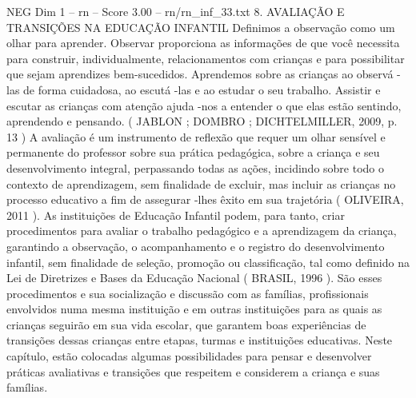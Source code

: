 \begin{textsample}{NEG Dim 1 – rn – Score 3.00 – rn/rn\_inf\_33.txt}  \label{ex:f1_neg_028}
8.
AVALIAÇÃO E TRANSIÇÕES NA EDUCAÇÃO INFANTIL Definimos a observação como um olhar para aprender.
Observar proporciona as informações de que você necessita para construir, individualmente, relacionamentos com crianças e para possibilitar que sejam aprendizes bem-sucedidos.
Aprendemos sobre as crianças ao observá -las de forma cuidadosa, ao escutá -las e ao estudar o seu trabalho.
Assistir e escutar as crianças com atenção ajuda -nos a entender o que elas estão sentindo, aprendendo e pensando. ( JABLON ; DOMBRO ; DICHTELMILLER, 2009, p. 13 ) A avaliação é um instrumento de reflexão que requer um olhar sensível e permanente do professor sobre sua prática pedagógica, sobre a criança e seu desenvolvimento integral, perpassando todas as ações, incidindo sobre todo o contexto de aprendizagem, sem finalidade de excluir, mas incluir as crianças no processo educativo a fim de assegurar -lhes êxito em sua trajetória ( OLIVEIRA, 2011 ).
As instituições de Educação Infantil podem, para tanto, criar procedimentos para avaliar o trabalho pedagógico e a aprendizagem da criança, garantindo a observação, o acompanhamento e o registro do desenvolvimento infantil, sem finalidade de seleção, promoção ou classificação, tal como definido na Lei de Diretrizes e Bases da Educação Nacional ( BRASIL, 1996 ).
São esses procedimentos e sua socialização e discussão com as famílias, profissionais envolvidos numa mesma instituição e em outras instituições para as quais as crianças seguirão em sua vida escolar, que garantem boas experiências de transições dessas crianças entre etapas, turmas e instituições educativas.
Neste capítulo, estão colocadas algumas possibilidades para pensar e desenvolver práticas avaliativas e transições que respeitem e considerem a criança e suas famílias.

\end{textsample}
